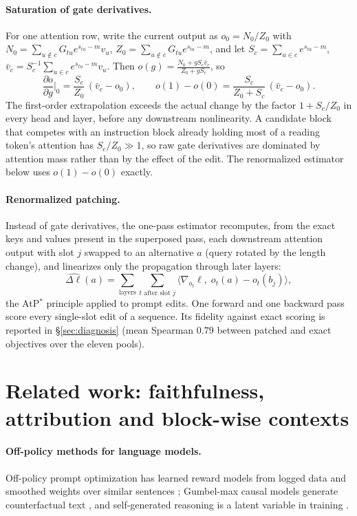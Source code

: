 \paragraph{Saturation of gate derivatives.} For one attention row, write the
current output as $o_0=N_0/Z_0$ with $N_0=\sum_{u\notin c}G_{tu}e^{s_{tu}-m}v_u$,
$Z_0=\sum_{u\notin c}G_{tu}e^{s_{tu}-m}$, and let $S_c=\sum_{u\in c}e^{s_{tu}-m}$,
$\bar v_c=S_c^{-1}\sum_{u\in c}e^{s_{tu}-m}v_u$. Then
$o(g)=\frac{N_0+gS_c\bar v_c}{Z_0+gS_c}$, so
\begin{equation*}
\frac{\partial o}{\partial g}\Big|_{0}=\frac{S_c}{Z_0}\,(\bar v_c-o_0),\qquad
o(1)-o(0)=\frac{S_c}{Z_0+S_c}\,(\bar v_c-o_0).
\end{equation*}
The first-order extrapolation exceeds the actual change by the factor
$1+S_c/Z_0$ in every head and layer, before any downstream nonlinearity. A
candidate block that competes with an instruction block already holding most of a
reading token's attention has $S_c/Z_0\gg1$, so raw gate derivatives are dominated
by attention mass rather than by the effect of the edit. The renormalized estimator
below uses $o(1)-o(0)$ exactly.

\paragraph{Renormalized patching.} Instead of gate derivatives, the one-pass estimator recomputes,
from the exact keys and values present in the superposed pass, each downstream attention output
with slot $j$ swapped to an alternative $a$ (query rotated by the length change), and linearizes
only the propagation through later layers:
\begin{equation}
\widehat{\Delta\ell}(a)=\sum_{\text{layers}}\sum_{t\text{ after slot }j}\big\langle\nabla_{o_t}\ell,\;o_t(a)-o_t(b_j)\big\rangle ,
\label{eq:patch}
\end{equation}
the AtP$^*$ principle \citep{kramar2024atp} applied to prompt edits. One forward and one backward
pass score every single-slot edit of a sequence. Its fidelity against exact scoring is reported in
\S\ref{sec:diagnosis} (mean Spearman $0.79$ between patched and exact objectives over the eleven
pools).

\section{Related work: faithfulness, attribution and block-wise contexts}
\label{app:related}
\paragraph{Off-policy methods for language models.} Off-policy prompt optimization has learned
reward models from logged data \citep{sun2024promptoirl} and smoothed weights over similar
sentences \citep{kiyohara2025logged}; Gumbel-max causal models generate counterfactual text
\citep{ravfogel2025gumbel,chatzi2025counterfactual}, and self-generated reasoning is a latent
variable in training \citep{zelikman2022star,phan2023trice}.


